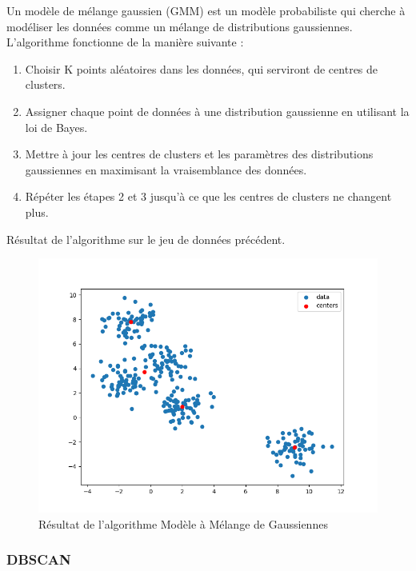 \documentclass[french,a4paper,18pt]{article}
\begin{document}
Un modèle de mélange gaussien (GMM) est un modèle probabiliste qui cherche à modéliser les données comme un mélange de distributions gaussiennes.
L'algorithme fonctionne de la manière suivante :
\begin{enumerate}
    \item Choisir K points aléatoires dans les données, qui serviront de centres de clusters.
    \item Assigner chaque point de données à une distribution gaussienne en utilisant la loi de Bayes.
    \item Mettre à jour les centres de clusters et les paramètres des distributions gaussiennes en maximisant la vraisemblance des données.
    \item Répéter les étapes 2 et 3 jusqu'à ce que les centres de clusters ne changent plus.
\end{enumerate}

Résultat de l'algorithme sur le jeu de données précédent.
\begin{figure}[h!]
    \centering
    \includegraphics[scale=0.3]{images/short_simulation_gmm.png}
    \caption{Résultat de l'algorithme Modèle à Mélange de Gaussiennes}\label{fig:short_simulation_gmm}
\end{figure}

\subsubsection{DBSCAN}
\end{document}
